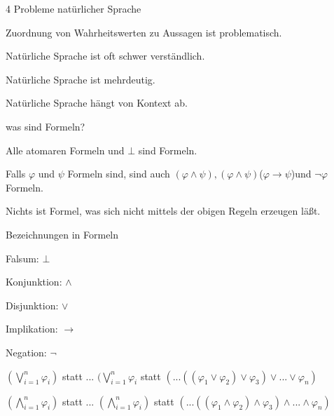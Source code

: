 \documentclass[avery5371]{flashcards}
\begin{document}

\begin{flashcard}{ 4 Probleme natürlicher Sprache }
    \begin{enumerate*}
        \item Zuordnung von Wahrheitswerten zu Aussagen ist problematisch.
        \item Natürliche Sprache ist oft schwer verständlich.
        \item Natürliche Sprache ist mehrdeutig.
        \item Natürliche Sprache hängt von Kontext ab.
    \end{enumerate*}
\end{flashcard}

\begin{flashcard}{ was sind Formeln? }
    \begin{enumerate*}
        \item Alle atomaren Formeln und $\bot$ sind Formeln.
        \item Falls $\varphi$ und $\psi$ Formeln sind, sind auch $(\varphi\wedge\psi),(\varphi\wedge\psi)$($\varphi \rightarrow\psi$)und $\lnot\varphi$Formeln.
        \item Nichts ist Formel, was sich nicht mittels der obigen Regeln erzeugen läßt.
    \end{enumerate*}
\end{flashcard}

\begin{flashcard}{ Bezeichnungen in Formeln }
    \begin{itemize*}
        \item Falsum: $\bot$
        \item Konjunktion: $\wedge$
        \item Disjunktion: $\vee$
        \item Implikation: $\rightarrow$
        \item Negation: $\lnot$
    \end{itemize*}
\end{flashcard}

\begin{flashcard}{ $(\bigvee_{i=1}^n \varphi_i)$ statt ... }
    $(\bigvee_{i=1}^n \varphi_i$ statt $(...((\varphi_1\vee\varphi_2)\vee\varphi_3)\vee...\vee\varphi_n)$
\end{flashcard}

\begin{flashcard}{ $(\bigwedge_{i=1}^n \varphi_i)$ statt ... }
    $(\bigwedge_{i=1}^n \varphi_i)$ statt $(...((\varphi_1\wedge\varphi_2)\wedge\varphi_3)\wedge...\wedge\varphi_n)$
\end{flashcard}
\end{document}

